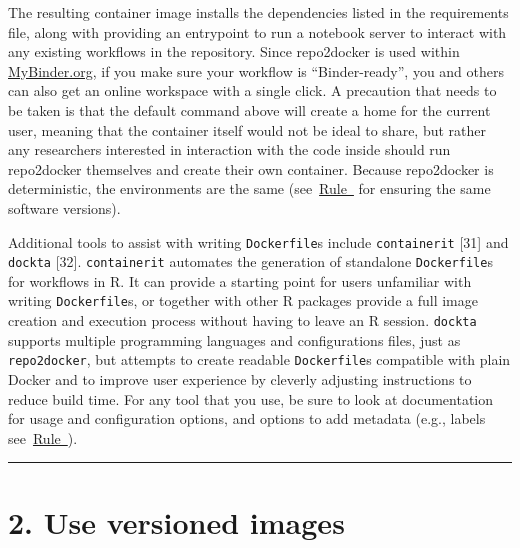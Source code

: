 \documentclass[10pt,letterpaper]{article}
\begin{document}
The resulting container image installs the dependencies listed in the
requirements file, along with providing an entrypoint to run a notebook
server to interact with any existing workflows in the repository. Since
repo2docker is used within \href{https://mybinder.org/}{MyBinder.org},
if you make sure your workflow is ``Binder-ready'', you and others can
also get an online workspace with a single click. A precaution that
needs to be taken is that the default command above will create a home
for the current user, meaning that the container itself would not be
ideal to share, but rather any researchers interested in interaction
with the code inside should run repo2docker themselves and create their
own container. Because repo2docker is deterministic, the environments
are the same
(see~\hyperref[{rule:pinning}]{Rule~} for
ensuring the same software versions).

Additional tools to assist with writing \texttt{Dockerfile}s include
\texttt{containerit} {[}31{]} and \texttt{dockta} {[}32{]}.
\texttt{containerit} automates the generation of standalone
\texttt{Dockerfile}s for workflows in R. It can provide a starting point
for users unfamiliar with writing \texttt{Dockerfile}s, or together with
other R packages provide a full image creation and execution process
without having to leave an R session. \texttt{dockta} supports multiple
programming languages and configurations files, just as
\texttt{repo2docker}, but attempts to create readable
\texttt{Dockerfile}s compatible with plain Docker and to improve user
experience by cleverly adjusting instructions to reduce build time. For
any tool that you use, be sure to look at documentation for usage and
configuration options, and options to add metadata (e.g., labels
see~\hyperref[{rule:document}]{Rule~}).

\begin{center}\rule{0.5\linewidth}{0.5pt}\end{center}

\hypertarget{use-versioned-images}{%
\section*{2. Use versioned images}\label{use-versioned-images}}

  \label{rule:base} 
\end{document}
